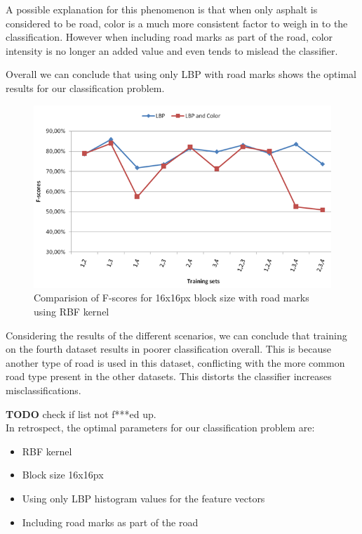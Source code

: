 \documentclass[runningheads,a4paper]{llncs}
\begin{document}
A possible explanation for this phenomenon is that when only asphalt is considered to be road, color is a much more consistent factor to weigh in to the classification. However when including road marks as part of the road, color intensity is no longer an added value and even tends to mislead the classifier. 

Overall we can conclude that using only LBP with road marks shows the optimal results for our classification problem. 

\begin{figure}[h]
\centering
\includegraphics[width=\textwidth]{fig/16_wi_roadmarks.png}
\caption{Comparision of F-scores for 16x16px block size with road marks using RBF kernel }
\label{fig:16_wi_roadmarks}
\end{figure}

Considering the results of the different scenarios, we can conclude that training on the fourth dataset results in poorer classification overall. This is because another type of road is used in this dataset, conflicting with the more common road type present in the other datasets. This distorts the classifier increases misclassifications.

\textbf{TODO} check if list not f***ed up.\\
\noindent In retrospect, the optimal parameters for our classification problem are:
\begin{itemize}
\item RBF kernel
\item Block size 16x16px
\item Using only LBP histogram values for the feature vectors
\item Including road marks as part of the road  
\end{itemize}
\end{document}

